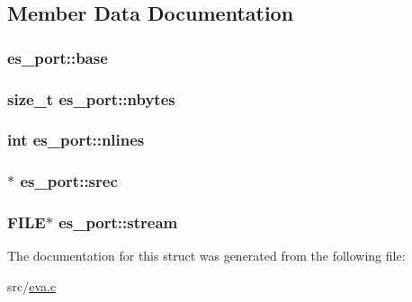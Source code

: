 \subsection{Member Data Documentation}
\hypertarget{structes__port_a4c95c5991712ac0400ceabe049f48573}{
\subsubsection[{base}]{ es\-\_\-port\-::base}}\label{structes__port_a4c95c5991712ac0400ceabe049f48573}
\hypertarget{structes__port_a283806721ce2690cc685ff2bafaebf9c}{
\subsubsection[{nbytes}]{\setlength{\rightskip}{0pt plus 5cm}size\-\_\-t es\-\_\-port\-::nbytes}}\label{structes__port_a283806721ce2690cc685ff2bafaebf9c}
\hypertarget{structes__port_a80c87ed8392c758c5828ae04f9e2d4d6}{
\subsubsection[{nlines}]{\setlength{\rightskip}{0pt plus 5cm}int es\-\_\-port\-::nlines}}\label{structes__port_a80c87ed8392c758c5828ae04f9e2d4d6}
\hypertarget{structes__port_acb31875335022ea1c48b3fe399120d06}{
\subsubsection[{srec}]{$\ast$ es\-\_\-port\-::srec}}\label{structes__port_acb31875335022ea1c48b3fe399120d06}
\hypertarget{structes__port_a57fac42faee92a8575431edbc517f657}{
\subsubsection[{stream}]{\setlength{\rightskip}{0pt plus 5cm}F\-I\-L\-E$\ast$ es\-\_\-port\-::stream}}\label{structes__port_a57fac42faee92a8575431edbc517f657}


The documentation for this struct was generated from the following file\-:\begin{DoxyCompactItemize}
\item 
src/\hyperlink{eva_8c}{eva.\-c}\end{DoxyCompactItemize}
